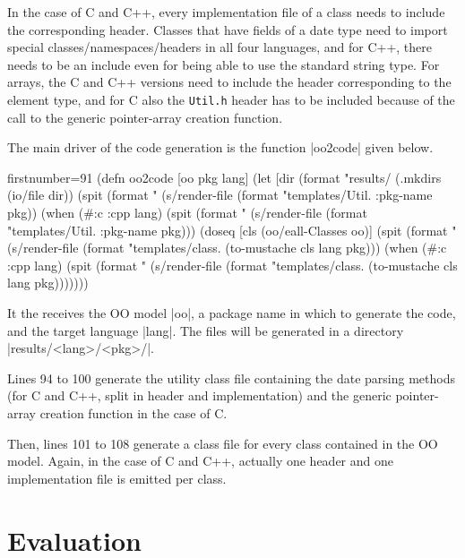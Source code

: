 \documentclass[submission]{eptcs}
\newcommand{\code}{\clojureinline}
\begin{document}
In the case of C and C++, every implementation file of a class needs to include
the corresponding header.  Classes that have fields of a date type need to
import special classes/namespaces/headers in all four languages, and for C++,
there needs to be an include even for being able to use the standard string
type.  For arrays, the C and C++ versions need to include the header
corresponding to the element type, and for C also the \texttt{Util.h} header
has to be included because of the call to the generic pointer-array creation
function.

The main driver of the code generation is the function \code|oo2code| given
below.

\begin{clojurecode*}{firstnumber=91}
(defn oo2code [oo pkg lang]
  (let [dir (format "results/%
    (.mkdirs (io/file dir))
    (spit (format "%
          (s/render-file (format "templates/Util.%
                         {:pkg-name pkg}))
    (when (#{:c :cpp} lang)
      (spit (format "%
            (s/render-file (format "templates/Util.%
                           {:pkg-name pkg})))
    (doseq [cls (oo/eall-Classes oo)]
      (spit (format "%
            (s/render-file (format "templates/class.%
                           (to-mustache cls lang pkg)))
      (when (#{:c :cpp} lang)
        (spit (format "%
              (s/render-file (format "templates/class.%
                             (to-mustache cls lang pkg)))))))
\end{clojurecode*}

It the receives the OO model \code|oo|, a package name in which to generate the
code, and the target language \code|lang|.  The files will be generated in a
directory \code|results/<lang>/<pkg>/|.

Lines 94 to 100 generate the utility class file containing the date parsing
methods (for C and C++, split in header and implementation) and the generic
pointer-array creation function in the case of C.

Then, lines 101 to 108 generate a class file for every class contained in the
OO model.  Again, in the case of C and C++, actually one header and one
implementation file is emitted per class.

\section{Evaluation}
\label{sec:evaluation}
\end{document}
